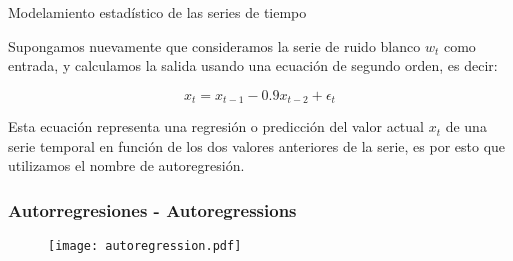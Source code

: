 \documentclass[xcolor=(list of options)]{beamer}
\begin{document}
\begin{section}{Modelamiento estad\'istico de las series de tiempo}
\begin{frame}
Supongamos nuevamente que consideramos la serie de ruido blanco $w_t$ como entrada, y calculamos la salida usando una ecuaci\'on de segundo orden, es decir:

\begin{equation*}
x_t = x_{t-1} - 0.9 x_{t-2} + \epsilon_t
\end{equation*}

Esta ecuaci\'on representa una regresi\'on o predicci\'on del valor actual $x_t$ de una serie temporal en funci\'on de los dos valores anteriores de la serie, es por esto que utilizamos el nombre de autoregresi\'on.

\end{frame}

\begin{frame}
\frametitle{Autorregresiones - Autoregressions}

\begin{figure}[t!]
\texttt{[image: autoregression.pdf]}
\end{figure}

\end{frame}

\end{section}
\end{document}
